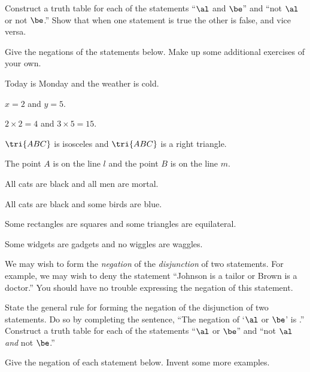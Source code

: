 \documentclass[11pt]{book}
\theoremstyle{bkplain}
\theoremstyle{XIplainnote}
\theoremstyle{bkplain}
\theoremstyle{bkplain}
\begin{document}
\begin{IIproblem}
Construct a truth table for each of the statements ``$\al$ and
$\be$'' and ``not $\al$ or not $\be$.'' Show that when one statement is true the
other is false, and vice versa.
\end{IIproblem}


Give the negations of the statements below. Make up some additional exercises of
your own.

\begin{exercisecols}
\begin{exlist}
\item Today is Monday and the weather is cold.
\item $x = 2$ and $y = 5$.
\item $2 \times 2 = 4$ and $3 \times 5 = 15$.
\item $\tri{ABC}$ is isosceles and $\tri{ABC}$ is a right triangle.
\item The point $A$ is on the line $l$ and the point $B$ is on the line $m$.
\item[\stex 6.] All cats are black and all men are mortal.
\item[\stex 7.] All cats are black and some birds are blue.
\item[\stex 8.] Some rectangles are squares and some triangles are equilateral.
\item[\stex 9.] Some widgets are gadgets and no wiggles are waggles.
\end{exlist}
\end{exercisecols}

We may wish to form the \emph{negation} of the \emph{disjunction} of two
statements. For example, we may wish to deny the statement ``Johnson is a tailor
or Brown is a doctor.'' You should have no trouble expressing the negation of this
statement.

\begin{IIproblem}
State the general rule for forming the negation of the
disjunction of two statements. Do so by completing the sentence, ``The negation of
`$\al$ or $\be$' is \underline{\hspace{5em}}.'' Construct a truth table for each of
the statements ``$\al$ or $\be$'' and ``not $\al$ \emph{and} not $\be$.''
\end{IIproblem}


Give the negation of each statement below. Invent some more examples.
\end{document}
